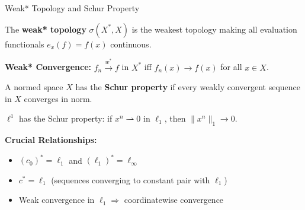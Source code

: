 \documentclass[aspectratio=169,10pt]{beamer}
\begin{document}
\begin{frame}{Weak* Topology and Schur Property}
  \begin{definition}
    The \textbf{weak* topology} $\sigma(X^*, X)$ is the weakest topology making all evaluation functionals $e_x(f) = f(x)$ continuous.
  \end{definition}

  \vspace{0.3cm}
  \textbf{Weak* Convergence:} $f_n \xrightarrow{w^*} f$ in $X^*$ iff $f_n(x) \to f(x)$ for all $x \in X$.

  \vspace{0.3cm}
  \begin{definition}
    A normed space $X$ has the \textbf{Schur property} if every weakly convergent sequence in $X$ converges in norm.
  \end{definition}

  \vspace{0.3cm}
  \begin{lemma}
    $\ell^1$ has the Schur property: if $x^n \rightharpoonup 0$ in $\ell_1$, then $\|x^n\|_1 \to 0$.
  \end{lemma}

  \vspace{0.3cm}
  \textbf{Crucial Relationships:}
  \begin{itemize}
    \item $(c_0)^* = \ell_1$ and $(\ell_1)^* = \ell_\infty$
    \item $c^* = \ell_1$ (sequences converging to constant pair with $\ell_1$)
    \item Weak convergence in $\ell_1 \Rightarrow$ coordinatewise convergence
  \end{itemize}
\end{frame}
\end{document}
